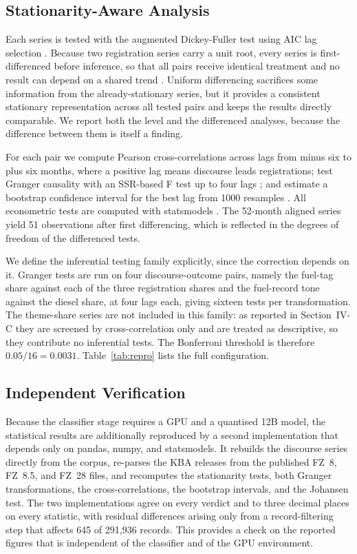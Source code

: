\documentclass[conference]{IEEEtran}
\begin{document}
\subsection{Stationarity-Aware Analysis}
Each series is tested with the augmented Dickey-Fuller test using AIC lag
selection \cite{dickeyfuller1979}. Because two registration series carry a unit
root, every series is first-differenced before inference, so that all pairs
receive identical treatment and no result can depend on a shared trend
\cite{grangernewbold1974}. Uniform differencing sacrifices some information from
the already-stationary series, but it provides a consistent stationary
representation across all tested pairs and keeps the results directly
comparable. We report both the level and the differenced analyses, because the
difference between them is itself a finding.

For each pair we compute Pearson cross-correlations across lags from minus six
to plus six months, where a positive lag means discourse leads registrations;
test Granger causality with an SSR-based F test up to four lags
\cite{granger1969}; and estimate a bootstrap confidence interval for the best
lag from 1000 resamples \cite{efron1993}. All econometric tests are computed
with statsmodels \cite{statsmodels}. The 52-month aligned series yield 51
observations after first differencing, which is reflected in the degrees of
freedom of the differenced tests.

We define the inferential testing family explicitly, since the correction
depends on it. Granger tests are run on four discourse-outcome pairs, namely
the fuel-tag share against each of the three registration shares and the
fuel-record tone against the diesel share, at four lags each, giving sixteen
tests per transformation. The theme-share series are not included in this
family: as reported in Section~IV-C they are screened by cross-correlation only
and are treated as descriptive, so they contribute no inferential tests. The
Bonferroni threshold is therefore $0.05/16 = 0.0031$.
Table~\ref{tab:repro} lists the full configuration.

\subsection{Independent Verification}
Because the classifier stage requires a GPU and a quantised 12B model, the
statistical results are additionally reproduced by a second implementation that
depends only on pandas, numpy, and statsmodels. It rebuilds the discourse series
directly from the corpus, re-parses the KBA releases from the published FZ~8,
FZ~8.5, and FZ~28 files, and recomputes the stationarity tests, both Granger
transformations, the cross-correlations, the bootstrap intervals, and the
Johansen test. The two implementations agree on every verdict and to three
decimal places on every statistic, with residual differences arising only from a
record-filtering step that affects 645 of 291{,}936 records. This provides a
check on the reported figures that is independent of the classifier and of the
GPU environment.
\end{document}
